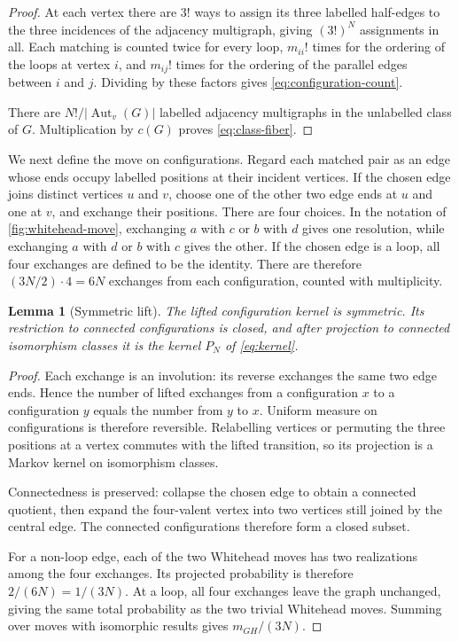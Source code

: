 \documentclass[11pt]{article}
\newcommand{\Aut}{\operatorname{Aut}}
\theoremstyle{plain}
\newtheorem{lemma}[lemma]{Lemma}
\theoremstyle{definition}
\numberwithin{equation}{section}
\begin{document}
\begin{proof}
At each vertex there are $3!$ ways to assign its three labelled half-edges to
the three incidences of the adjacency multigraph, giving $(3!)^N$ assignments
in all.  Each matching is counted twice for every loop, $m_{ii}!$ times for
the ordering of the loops at vertex $i$, and $m_{ij}!$ times for the ordering
of the parallel edges between $i$ and $j$.  Dividing by these factors gives
\eqref{eq:configuration-count}.

There are $N!/|\Aut_v(G)|$ labelled adjacency multigraphs in the unlabelled
class of $G$.  Multiplication by $c(G)$ proves
\eqref{eq:class-fiber}.
\end{proof}

We next define the move on configurations.  Regard each matched pair as an
edge whose ends occupy labelled positions at their incident vertices.  If the
chosen edge joins distinct vertices $u$ and $v$, choose one of the other two
edge ends at $u$ and one at $v$, and exchange their positions.  There are four
choices.  In the notation of
\cref{fig:whitehead-move}, exchanging $a$ with $c$ or $b$ with $d$ gives one
resolution, while exchanging $a$ with $d$ or $b$ with $c$ gives the other.
If the chosen edge is a loop, all four exchanges are defined to be the
identity.  There are therefore $(3N/2)\cdot4=6N$ exchanges from each
configuration, counted with multiplicity.

\begin{lemma}[Symmetric lift]\label{lem:symmetric-lift}
The lifted configuration kernel is symmetric.  Its restriction to connected
configurations is closed, and after projection to connected isomorphism
classes it is the kernel $P_N$ of \eqref{eq:kernel}.
\end{lemma}

\begin{proof}
Each exchange is an involution: its reverse exchanges the same two edge ends.
Hence the number of lifted exchanges from a configuration $x$ to a configuration
$y$ equals the number from $y$ to $x$.  Uniform measure on configurations is
therefore reversible.  Relabelling vertices or permuting the three positions at a
vertex commutes with the lifted transition, so its projection is a Markov
kernel on isomorphism classes.

Connectedness is preserved: collapse the chosen edge to obtain a connected
quotient, then expand the four-valent vertex into two vertices still joined by
the central edge.  The connected configurations therefore form a closed
subset.

For a non-loop edge, each of the two Whitehead moves has two realizations
among the four exchanges.  Its projected probability is therefore
$2/(6N)=1/(3N)$.  At a loop, all four exchanges leave the graph unchanged,
giving the same total probability as the two trivial Whitehead moves.
Summing over moves with isomorphic results gives $m_{GH}/(3N)$.
\end{proof}
\end{document}
